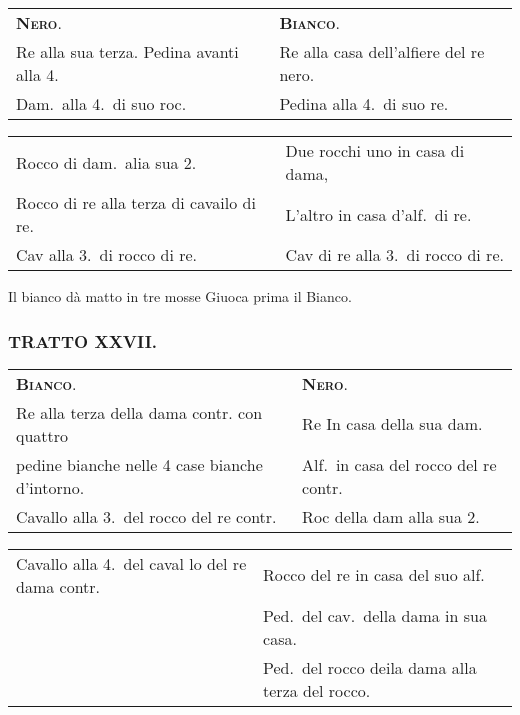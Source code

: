 \documentclass[11pt,a6paper]{article}
\begin{document}
{\small
\noindent\begin{tabular}{@{}p{3.84cm}p{3.84cm}}
{\bfseries\scshape Nero}. & {\bfseries\scshape Bianco}. \\
Re alla sua terza. Pedina avanti alla 4. &Re alla casa dell'alfiere del re nero.\\
Dam.\ alla 4.\ di suo roc. &Pedina alla 4.\ di suo re.\\
\end{tabular}

\noindent\begin{tabular}{@{}p{3.84cm}p{3.84cm}}
Rocco di dam.\ alia sua 2. &Due rocchi uno in casa di dama,\\
Rocco di re alla terza di cavailo di re. &L'altro in casa d'alf.\ di re.\\
Cav alla 3.\ di rocco di re.& Cav di re alla 3.\ di rocco di re.\\
\end{tabular}
}

Il bianco dà matto in tre mosse Giuoca prima il Bianco.



\subsubsection{TRATTO XXVII.}

{\small
\noindent\begin{tabular}{@{}p{3.84cm}p{3.84cm}}
{\bfseries\scshape Bianco}. & {\bfseries\scshape Nero}. \\
Re alla terza della dama contr. con quattro&Re In casa della sua dam. \\
pedine bianche nelle 4 case bianche d'intorno. &Alf.\ in casa del rocco del re contr. \\
Cavallo alla 3.\ del rocco del re contr. &Roc della dam alla sua 2.\\
\end{tabular}

\noindent\begin{tabular}{@{}p{3.84cm}p{3.84cm}}
Cavallo alla 4.\ del caval lo del re dama contr. &Rocco del re in casa del suo alf.\\
&Ped.\ del cav.\ della dama in sua casa. \\
&Ped.\ del rocco deila dama alla terza del rocco.\\
\end{tabular}}
\end{document}
